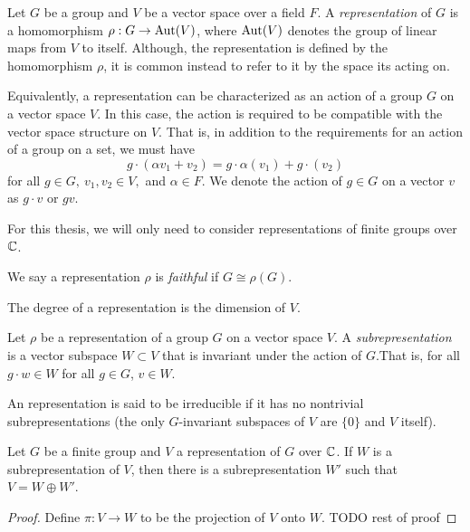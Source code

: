 \begin{definition}
    Let $G$ be a group and $V$ be a vector space over a field $F$. A \emph{representation} of $G$ is a homomorphism 
    $\rho : G \rightarrow \operatorname{Aut}(V)$, where $\operatorname{Aut}(V)$ denotes the group of linear maps from $V$ to itself. Although, 
    the representation is defined by the homomorphism $\rho$, it is common instead to refer to it by the space its 
    acting on.

    Equivalently, a representation can be characterized as an action of a group $G$ on a vector space $V$. In this 
    case, the action is required to be compatible with the vector space structure on $V$. That is, in addition to 
    the requirements for an action of a group on a set, we must have
\[g \cdot (\alpha v_1 + v_2) = g\cdot \alpha(v_1) + g\cdot(v_2)\]
    for all $g \in G,\ v_1, v_2 \in V,$ and $\alpha \in F$.
    We denote the action of $g \in G$ on a vector $v$ as $g \cdot v$ or $gv$.
\end{definition}

For this thesis, we will only need to consider representations of finite groups over $\mathbb{C}$.

We say a representation $\rho$ is \emph{faithful} if $G \cong \rho(G)$.

The degree of a representation is the dimension of $V$.

 
\begin{definition}
    Let $\rho$ be a representation of a group $G$ on a vector space $V$. A \emph{subrepresentation} is a vector 
    subspace $W \subset V$ that is invariant under the action of $G$.\footnotemark That is, for all $g\cdot w \in 
    W$ for all $g \in G$, $v \in W$.
    
    An representation is said to be irreducible if it has no nontrivial subrepresentations (the only $G$-invariant 
    subspaces of $V$ are $\{ 0 \}$ and $V$ itself).
\end{definition}


\begin{theorem}
    Let $G$ be a finite group and $V$ a representation of $G$ over $\mathbb{C}$. If $W$ is a subrepresentation of $V$, then 
there is a subrepresentation $W'$ such that $V = W \oplus W'$.  
\end{theorem}




\begin{proof}
    Define $\pi : V \rightarrow W$ to be the projection of $V$ onto $W$. TODO rest of proof

\end{proof}



